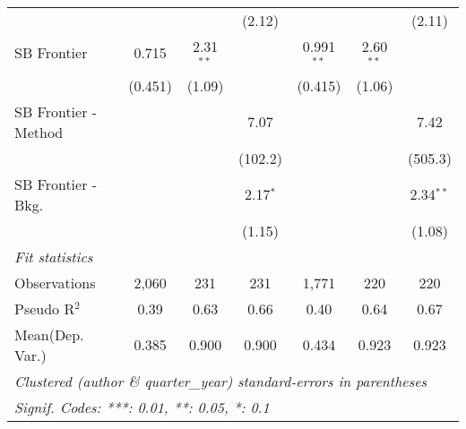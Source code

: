 \begin{tabular}{lcccccc}
                        &         &             & (2.12)      &              &             & (2.11)\\   
   SB Frontier          & 0.715   & 2.31$^{**}$ &             & 0.991$^{**}$ & 2.60$^{**}$ &   \\   
                        & (0.451) & (1.09)      &             & (0.415)      & (1.06)      &   \\   
   SB Frontier - Method &         &             & 7.07        &              &             & 7.42\\   
                        &         &             & (102.2)     &              &             & (505.3)\\   
   SB Frontier - Bkg.   &         &             & 2.17$^{*}$  &              &             & 2.34$^{**}$\\   
                        &         &             & (1.15)      &              &             & (1.08)\\   
   \midrule
   \emph{Fit statistics}\\
   Observations         & 2,060   & 231         & 231         & 1,771        & 220         & 220\\  
   Pseudo R$^2$         & 0.39    & 0.63        & 0.66        & 0.40         & 0.64        & 0.67\\  
Mean(Dep. Var.) & 0.385 & 0.900 & 0.900 & 0.434 & 0.923 & 0.923 \\
   \midrule \midrule
   \multicolumn{7}{l}{\emph{Clustered (author \& quarter\_year) standard-errors in parentheses}}\\
   \multicolumn{7}{l}{\emph{Signif. Codes: ***: 0.01, **: 0.05, *: 0.1}}\\
\end{tabular}
\par\endgroup
